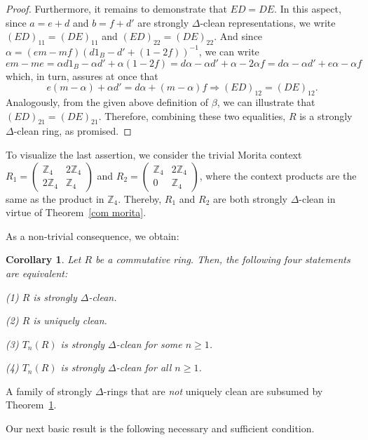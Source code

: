 \documentclass[12pt]{amsart}
\newtheorem{corollary}[theorem]{Corollary}
\theoremstyle{definition}
\begin{document}
\begin{proof}
Furthermore, it remains to demonstrate that $ED=DE$. In this aspect, since $a=e+d$ and $b=f+d'$ are strongly $\Delta$-clean representations, we write $(ED)_{11}=(DE)_{11}$ and $(ED)_{22}=(DE)_{22}$. And since $\alpha = (em-mf)(d1_B -d' +(1-2f))^{-1}$, we can write
\[
em-me=\alpha d1_B - \alpha d' +\alpha(1-2f)=d \alpha - \alpha d' +\alpha - 2\alpha f = d \alpha - \alpha d' +e \alpha - \alpha f
\]
which, in turn, assures at once that
\[
e(m- \alpha ) +\alpha d'=d\alpha +(m- \alpha )f \Rightarrow (ED)_{12}=(DE)_{12}.
\]
Analogously, from the given above definition of $\beta$, we can illustrate that $(ED)_{21}=(DE)_{21}$. Therefore, combining these two equalities, $R$ is a strongly $\Delta$-clean ring, as promised.
\end{proof}

To visualize the last assertion, we consider the trivial Morita context $R_1 =
\begin{pmatrix}
\mathbb{Z}_4 & 2\mathbb{Z}_4 \\
2\mathbb{Z}_4 & \mathbb{Z}_4
\end{pmatrix}$ and
$R_2 =
\begin{pmatrix}
\mathbb{Z}_4 & 2\mathbb{Z}_4 \\
0 & \mathbb{Z}_4
\end{pmatrix}$,
where the context products are the same as the product in $\mathbb{Z}_4$. Thereby, $R_1$ and $R_2$ are both strongly $\Delta$-clean in virtue of Theorem~\ref{com morita}.

\medskip

As a non-trivial consequence, we obtain:

\begin{corollary} \label{triangular}
Let $R$ be a commutative ring. Then, the following four statements are equivalent:
	
(1) $R$ is strongly $\Delta$-clean.
	
(2) $R$ is uniquely clean.
	
(3) $T_n(R)$ is strongly $\Delta$-clean for some $n \geq 1$.
	
(4) $T_n(R)$ is strongly $\Delta$-clean for all $n \geq 1$.
\end{corollary}

A family of strongly $\Delta$-rings that are {\it not} uniquely clean are subsumed by Theorem~\ref{triangular}.

\medskip

Our next basic result is the following necessary and sufficient condition.
\end{document}
